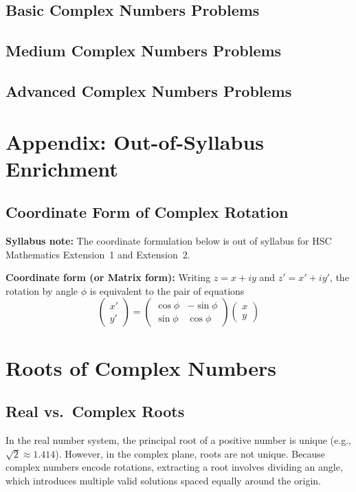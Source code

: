 \documentclass[12pt]{article}
\begin{document}
\subsection{Basic Complex Numbers Problems}


\subsection{Medium Complex Numbers Problems}


\subsection{Advanced Complex Numbers Problems}


\appendix
\section{Appendix: Out-of-Syllabus Enrichment}

\subsection{Coordinate Form of Complex Rotation}
\textbf{Syllabus note:} The coordinate formulation below is out of syllabus for HSC Mathematics Extension~1 and Extension~2.

\textbf{Coordinate form (or Matrix form):} Writing $z = x + iy$ and $z' = x' + iy'$, the rotation by angle $\phi$ is equivalent to the pair of equations
\[
\begin{pmatrix} x' \\ y' \end{pmatrix} = \begin{pmatrix} \cos\phi & -\sin\phi \\ \sin\phi & \cos\phi \end{pmatrix} \begin{pmatrix} x \\ y \end{pmatrix}
\]

\section{Roots of Complex Numbers}

\subsection{Real vs.\ Complex Roots}
In the real number system, the principal root of a positive number is unique (e.g., $\sqrt{2} \approx 1.414$). However, in the complex plane, roots are not unique. Because complex numbers encode rotations, extracting a root involves dividing an angle, which introduces multiple valid solutions spaced equally around the origin.
\end{document}
